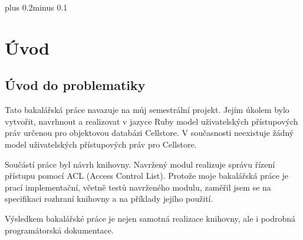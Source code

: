 \documentclass[11pt,twoside,a4paper]{book}
\begin{document}
\listoffigures



\listoftables



\mainbodystarts
\normalfont
{}\baselineskip plus 0.2\baselineskip minus 0.1\baselineskip



% 
% 


\chapter{Úvod}

\section{Úvod do problematiky}

Tato bakalářská práce navazuje na můj semestrální projekt. Jejím úkolem bylo vytvořit, navrhnout a realizovat v jazyce Ruby model uživatelských přístupových práv určenou pro objektovou databázi Cellstore. V současnosti neexistuje žádný model uživatelských přístupových práv pro Cellstore. 

Součástí práce byl návrh knihovny. Navržený modul realizuje správu řízení přístupu pomocí ACL (Access Control List). Protože moje bakalářská práce je prací implementační, včetně testů navrženého modulu, zaměřil jsem se na specifikaci rozhraní knihovny a na příklady jejího použití.

Výsledkem bakalářské práce je nejen samotná realizace knihovny, ale i podrobná programátorská dokumentace.
\end{document}
